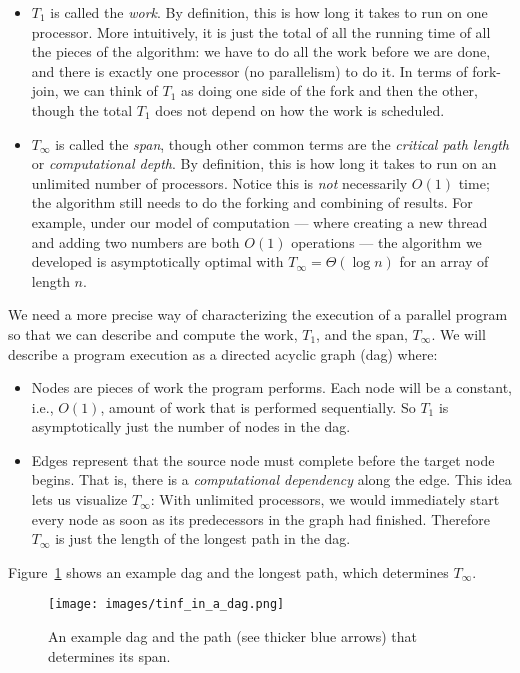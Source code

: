\documentclass[10pt]{article}
\begin{document}
\begin{itemize}
\item $T_1$ is called the \emph{work}.  By definition, this is how
  long it takes to run on one processor.  More intuitively, it is just
  the total of all the running time of all the pieces of the
  algorithm: we have to do all the work before we are done, and there
  is exactly one processor (no parallelism) to do it.  In terms of
  fork-join, we can think of $T_1$ as doing one side of the fork and
  then the other, though the total $T_1$ does not depend on how the
  work is scheduled.
\item $T_\infty$ is called the \emph{span}, though other common terms
  are the \emph{critical path length} or \emph{computational depth}.
  By definition, this is how long it takes to run on an unlimited
  number of processors.  Notice this is \emph{not} necessarily $O(1)$
  time; the algorithm still needs to do the forking and combining of
  results.  For example, under our model of computation --- where
  creating a new thread and adding two numbers are both $O(1)$
  operations --- the algorithm we developed is asymptotically optimal
  with $T_\infty=\Theta(\log n)$ for an array of length $n$.
\end{itemize}

We need a more precise way of characterizing the execution of a
parallel program so that we can describe and compute the work, $T_1$,
and the span, $T_\infty$.  We will describe a program execution as a
directed acyclic graph (dag) where:
\begin{itemize}
\item Nodes are pieces of work the program performs.  Each node will
  be a constant, i.e., $O(1)$, amount of work that is performed
  sequentially.  So $T_1$ is asymptotically just the number of nodes
  in the dag.
\item Edges represent that the source node must complete before the
  target node begins.  That is, there is a \emph{computational
  dependency} along the edge.  This idea lets us visualize $T_\infty$:
  With unlimited processors, we would immediately start every node as
  soon as its predecessors in the graph had finished.  Therefore
  $T_\infty$ is just the length of the longest path in the dag.
\end{itemize}
Figure~\ref{fig:tinf_in_a_dag} shows an example dag and the longest
path, which determines $T_\infty$.
\begin{figure}
\begin{center}
\texttt{[image: images/tinf\_in\_a\_dag.png]}
\end{center}
\caption{An example dag and the path (see thicker blue arrows) that determines its span.}
\label{fig:tinf_in_a_dag}
\end{figure}
\end{document}
